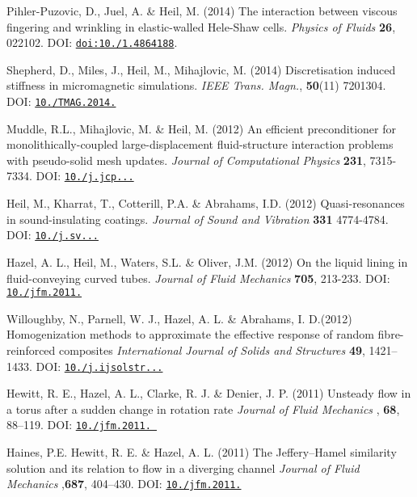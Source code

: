 \begin{DoxyItemize}
\item Pihler-\/\+Puzovic, D., Juel, A. \& Heil, M. (2014) The interaction between viscous fingering and wrinkling in elastic-\/walled Hele-\/\+Shaw cells. {\itshape Physics of Fluids} {\bfseries 26}, 022102. D\+OI\+: \href{http://scitation.aip.org/content/aip/journal/pof2/26/2/10.1063/1.4864188}{\tt doi\+:10./1.4864188}.
\item Shepherd, D., Miles, J., Heil, M., Mihajlovic, M. (2014) Discretisation induced stiffness in micromagnetic simulations. {\itshape  I\+E\+EE Trans. Magn.}, {\bfseries 50}(11) 7201304. D\+OI\+: \href{http://ieeexplore.ieee.org/xpls/abs_all.jsp?arnumber=6971771&tag=1}{\tt 10./\+T\+M\+AG.2014.}
\item Muddle, R.\+L., Mihajlovic, M. \& Heil, M. (2012) An efficient preconditioner for monolithically-\/coupled large-\/displacement fluid-\/structure interaction problems with pseudo-\/solid mesh updates. {\itshape Journal of Computational Physics} {\bfseries 231}, 7315-\/7334. D\+OI\+: \href{http://dx.doi.org/10.1016/j.jcp.2012.07.001}{\tt 10./j.jcp...}
\item Heil, M., Kharrat, T., Cotterill, P.\+A. \& Abrahams, I.\+D. (2012) Quasi-\/resonances in sound-\/insulating coatings. {\itshape Journal of Sound and Vibration} {\bfseries 331} 4774-\/4784. D\+OI\+: \href{http://dx.doi.org/10.1016/j.jsv.2012.05.029}{\tt 10./j.sv...}
\item Hazel, A. L., Heil, M., Waters, S.\+L. \& Oliver, J.\+M. (2012) On the liquid lining in fluid-\/conveying curved tubes. {\itshape Journal of Fluid Mechanics} {\bfseries 705}, 213-\/233. D\+OI\+: \href{http://dx.doi.org/10.1017/jfm.2011.346}{\tt 10./jfm.2011.}
\item Willoughby, N., Parnell, W. J., Hazel, A. L. \& Abrahams, I. D.(2012) Homogenization methods to approximate the effective response of random fibre-\/reinforced composites {\itshape  International Journal of Solids and Structures } {\bfseries 49}, 1421--1433. D\+OI\+: \href{http://dx.doi.org/10.1016/j.ijsolstr.2012.02.010}{\tt 10./j.ijsolstr...}
\item Hewitt, R. E., Hazel, A. L., Clarke, R. J. \& Denier, J. P. (2011) Unsteady flow in a torus after a sudden change in rotation rate {\itshape  Journal of Fluid Mechanics} , {\bfseries  68}, 88--119. D\+OI\+: \href{http://dx.doi.org/10.1017/jfm.2011.366}{\tt 10./jfm.2011. }
\item Haines, P.\+E. Hewitt, R. E. \& Hazel, A. L. (2011) The Jeffery--Hamel similarity solution and its relation to flow in a diverging channel {\itshape  Journal of Fluid Mechanics} ,{\bfseries  687}, 404--430. D\+OI\+: \href{http://dx.doi.org/10.1017/jfm.2011.362}{\tt 10./jfm.2011.}

\end{DoxyItemize}
